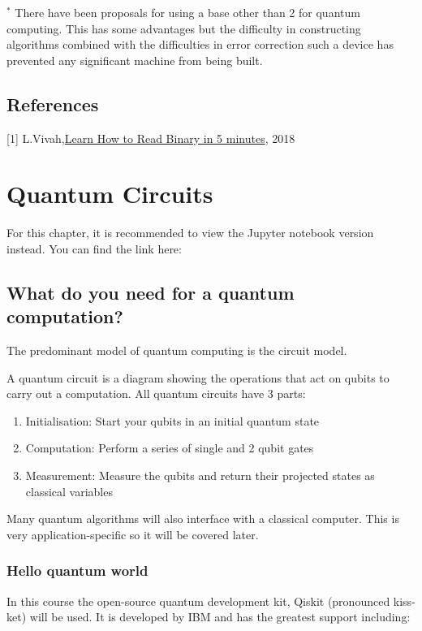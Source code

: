 \documentclass{book}
\begin{document}
$^*$ There have been proposals for using a base other than 2 for quantum computing. This has some advantages but the difficulty in constructing algorithms combined with the difficulties in error correction such a device has prevented any significant machine from being built.
\section{References}

[1] L.Vivah,\href{https://medium.com/@LindaVivah/learn-how-to-read-binary-in-5-minutes-dac1feb991e}{Learn How to Read Binary in 5 minutes}, 2018
\chapter{Quantum Circuits}

For this chapter, it is recommended to view the Jupyter notebook version instead. You can find the link here: 

\section{What do you need for a quantum computation?}

The predominant model of quantum computing is the circuit model. 

A quantum circuit is a diagram showing the operations that act on qubits to carry out a computation. All quantum circuits have 3 parts:

\begin{enumerate}
    \item Initialisation: Start your qubits in an initial quantum state
    \item Computation: Perform a series of single and 2 qubit gates
    \item Measurement: Measure the qubits and return their projected states as classical variables
\end{enumerate}

Many quantum algorithms will also interface with a classical computer. This is very application-specific so it will be covered later. 


\subsection{Hello quantum world}

In this course the open-source quantum development kit, Qiskit (pronounced kiss-ket) will be used. It is developed by IBM and has the greatest support including: 
\end{document}
